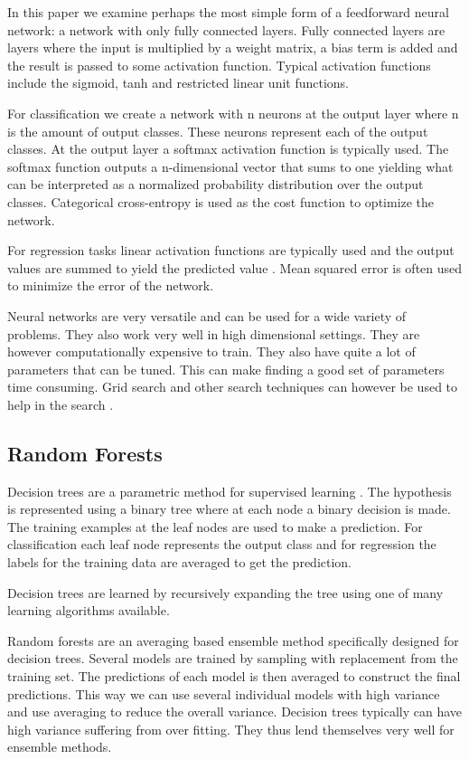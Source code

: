 In this paper we examine perhaps the most simple form of a feedforward neural network: a network with only fully connected layers. Fully connected layers are layers where the input is multiplied by a weight matrix, a bias term is added and the result is passed to some activation function. Typical activation functions include the sigmoid, tanh and restricted linear unit functions.

For classification we create a network with n neurons at the output layer where n is the amount of output classes. These neurons represent each of the output classes. At the output layer a softmax activation function is typically used. The softmax function outputs a n-dimensional vector that sums to one yielding what can be interpreted as a normalized probability distribution over the output classes. Categorical cross-entropy is used as the cost function to optimize the network.

For regression tasks linear activation functions are typically used and the output values are summed to yield the predicted value \cite{deeplearning4j-docs}. Mean squared error is often used to minimize the error of the network.

Neural networks are very versatile and can be used for a wide variety of problems. They also work very well in high dimensional settings. They are however computationally expensive to train. They also have quite a lot of parameters that can be tuned. This can make finding a good set of parameters time consuming. Grid search and other search techniques can however be used to help in the search \cite{deep-learning-book}.

\subsection{Random Forests}

Decision trees are a parametric method for supervised learning \cite{alpaydin}. The hypothesis is represented using a binary tree where at each node a binary decision is made. The training examples at the leaf nodes are used to make a prediction. For classification each leaf node represents the output class and for regression the labels for the training data are averaged to get the prediction.

Decision trees are learned by recursively expanding the tree using one of many learning algorithms available.

Random forests are an averaging based ensemble method specifically designed for decision trees. \cite{sklearn} Several models are trained by sampling with replacement from the training set. The predictions of each model is then averaged to construct the final predictions. This way we can use several individual models with high variance and use averaging to reduce the overall variance. Decision trees typically can have high variance suffering from over fitting. They thus lend themselves very well for ensemble methods.


